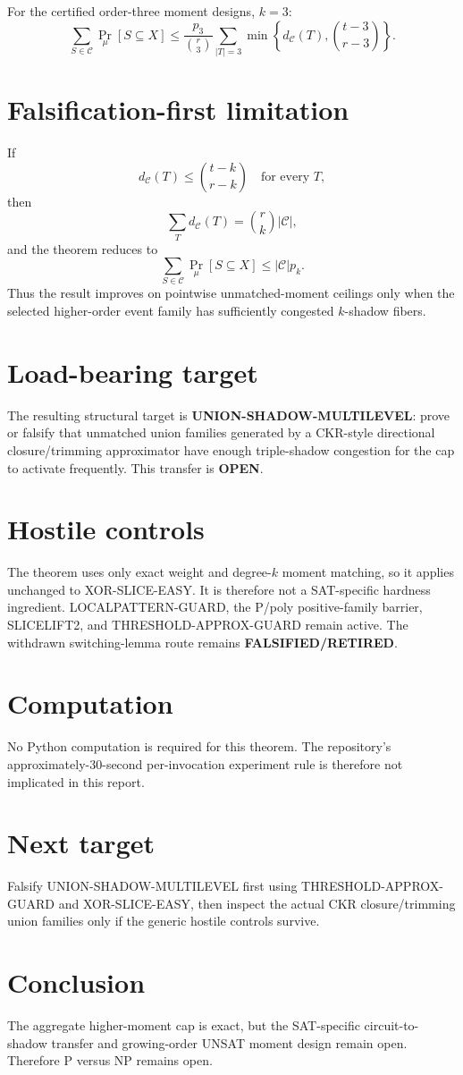 \documentclass[11pt]{article}
\begin{document}
For the certified order-three moment designs, $k=3$:
\[
\boxed{
\sum_{S\in\mathcal C}\Pr_\mu[S\subseteq X]
\le
\frac{p_3}{\binom r3}
\sum_{|T|=3}
\min\left\{
d_{\mathcal C}(T),\binom{t-3}{r-3}
\right\}.
}
\]

\section*{Falsification-first limitation}
If
\[
d_{\mathcal C}(T)\le\binom{t-k}{r-k}
\quad\text{for every }T,
\]
then
\[
\sum_Td_{\mathcal C}(T)=\binom rk|\mathcal C|,
\]
and the theorem reduces to
\[
\sum_{S\in\mathcal C}\Pr_\mu[S\subseteq X]\le|\mathcal C|p_k.
\]
Thus the result improves on pointwise unmatched-moment ceilings only when the selected higher-order event family has sufficiently congested $k$-shadow fibers.

\section*{Load-bearing target}
The resulting structural target is \textbf{UNION-SHADOW-MULTILEVEL}: prove or falsify that unmatched union families generated by a CKR-style directional closure/trimming approximator have enough triple-shadow congestion for the cap to activate frequently. This transfer is \textbf{OPEN}.

\section*{Hostile controls}
The theorem uses only exact weight and degree-$k$ moment matching, so it applies unchanged to XOR-SLICE-EASY. It is therefore not a SAT-specific hardness ingredient. LOCALPATTERN-GUARD, the P/poly positive-family barrier, SLICELIFT2, and THRESHOLD-APPROX-GUARD remain active. The withdrawn switching-lemma route remains \textbf{FALSIFIED/RETIRED}.

\section*{Computation}
No Python computation is required for this theorem. The repository's approximately-30-second per-invocation experiment rule is therefore not implicated in this report.

\section*{Next target}
Falsify UNION-SHADOW-MULTILEVEL first using THRESHOLD-APPROX-GUARD and XOR-SLICE-EASY, then inspect the actual CKR closure/trimming union families only if the generic hostile controls survive.

\section*{Conclusion}
The aggregate higher-moment cap is exact, but the SAT-specific circuit-to-shadow transfer and growing-order UNSAT moment design remain open. Therefore P versus NP remains open.

\end{document}
